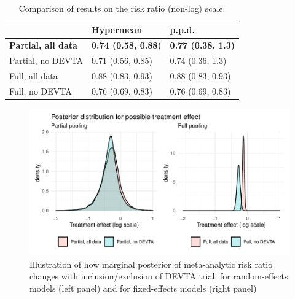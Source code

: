 \documentclass[12pt]{article}
\begin{document}
\begin{table}
\caption{Comparison of results of all four meta-analysis models fitted to our data, on log(RR) scale.}
\label{baggr-models-tab}
\centering
{}
\end{table}

\begin{table}
\caption{Comparison of results on the risk ratio (non-log) scale.}
\label{baggr-tab-exp}
\centering
\begin{tabular}[t]{lll}
\toprule
  & Hypermean & p.p.d.\\
\midrule
\textbf{Partial, all data} & \textbf{0.74 (0.58, 0.88)} & \textbf{0.77 (0.38, 1.3)}\\
Partial, no DEVTA & 0.71 (0.56, 0.85) & 0.74 (0.36, 1.3)\\
Full, all data & 0.88 (0.83, 0.93) & 0.88 (0.83, 0.93)\\
Full, no DEVTA & 0.76 (0.69, 0.83) & 0.76 (0.69, 0.83)\\
\bottomrule
\end{tabular}
\end{table}

\begin{figure}[h!]
\includegraphics{baggr-density.pdf}
\caption{Illustration of how marginal posterior of meta-analytic risk ratio changes with inclusion/exclusion of DEVTA trial, for random-effects models (left panel) and for fixed-effects models (right panel)}
\label{baggr-density}
\end{figure}
\end{document}
